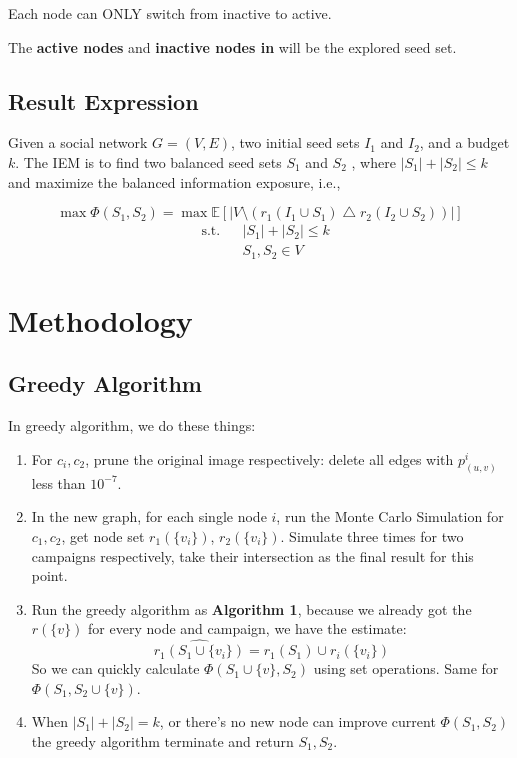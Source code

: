 \documentclass{article}
\begin{document}
Each node can ONLY switch from inactive to active.


The \textbf{active nodes} and \textbf{inactive nodes in } will be the explored seed set.


\subsection{Result Expression}
Given a social network $G = (V, E)$, two initial seed sets $I_1$ and $I_2$, and a budget $k$. The IEM is to find two balanced seed sets $S_1$ and $S_2$ , where $|S_1|+ |S_2| \leq k$ and maximize the balanced information exposure, i.e.,


$$
\max{\Phi (S_1, S_2)} = \max{\mathbb{E}[|V \setminus (r_1(I_1 \cup S_1)  \bigtriangleup r_2(I_2 \cup S_2))|]}
$$
$$
\begin{aligned}
& \text{s.t.} & & |S_1|+ |S_2| \leq k \\
& & & S_1, S_2 \in V
\end{aligned}
$$


\section{Methodology}

\subsection{Greedy Algorithm}
In greedy algorithm, we do these things:


\begin{enumerate}
    \item For $c_i, c_2$, prune the original image respectively: delete all edges with $p^i_{(u,v)}$ less than $10^{-7}$.
    \item In the new graph, for each single node $i$, run the Monte Carlo Simulation for $c_1, c_2$, get node set $r_1(\{v_i\})$, $r_2(\{v_i\})$. Simulate three times for two campaigns respectively, take their intersection as the final result for this point.
    \item Run the greedy algorithm as \textbf{Algorithm 1}, because we already got the $r(\{v\})$ for every  node and campaign, we have the estimate: $$\widehat{r_1(S_1 \cup \{v_i\})} = r_1(S_1) \cup r_i(\{v_i\})$$ So we can quickly calculate $\Phi(S_1 \cup \{v\}, S_2)$ using set operations. Same for $\Phi(S_1, S_2 \cup \{v\})$.
    \item When $|S_1|+|S_2| = k$, or there's no new node can improve current $\Phi (S_1,S_2)$ the greedy algorithm terminate and return $S_1, S_2$.
\end{enumerate}
\end{document}
